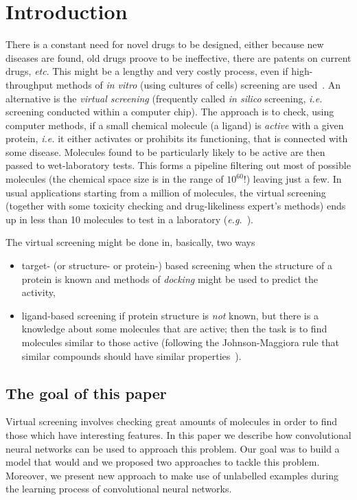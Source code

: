 \documentclass[a4paper,10pt]{report}
\begin{document}
  \chapter{Introduction}
      There is a constant need for novel drugs to be designed, either because new diseases are found, old drugs proove to be ineffective, there are patents on current drugs, \textit{etc}. This might be a lengthy and very costly process, even if high-throughput methods of \textit{in vitro} (using cultures of cells) screening are used~\cite{Breda2008}. An alternative is the \textit{virtual screening} (frequently called \textit{in silico} screening, \textit{i.e.} screening conducted within a computer chip). The approach is to check, using computer methods, if a small chemical molecule (a ligand) is \textit{active} with a given protein, \textit{i.e.} it either activates or prohibits its functioning, that is connected with some disease. Molecules found to be particularly likely to be active are then passed to wet-laboratory tests. This forms a pipeline filtering out most of possible molecules (the chemical space size is in the range of $10^{60}$!) leaving just a few. In usual applications starting from a million of molecules, the virtual screening (together with some toxicity checking and drug-likeliness expert's methods) ends up in less than 10 molecules to test in a laboratory (\textit{e.g.}~\cite{Pethukov2006}).

	  The virtual screening might be done in, basically, two ways~\cite{Geppert2010,Varnek2012}
	  \begin{itemize}
      \item target- (or structure- or protein-) based screening when the structure of a protein is known and methods of \textit{docking} might be used to predict the activity,
      \item ligand-based screening if protein structure is \textit{not} known, but there is a knowledge about some molecules that are active; then the task is to find molecules similar to those active (following the Johnson-Maggiora rule that similar compounds should have similar properties~\cite{Varnek2012}).
      \end{itemize}
  
    \section{The goal of this paper}
    
     Virtual screening involves checking great amounts of molecules in order to find those which have interesting features. In this paper we describe how convolutional neural networks can be used to approach this problem. Our goal was to build a model that would and we proposed two approaches to tackle this problem. Moreover, we present new approach to make use of unlabelled examples during the learning process of convolutional neural networks.
    
\end{document}
